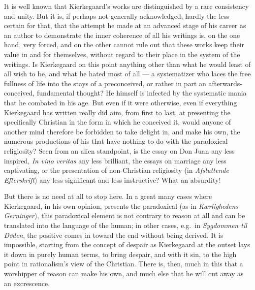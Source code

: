\documentclass[12pt,a4paper,openany]{book}
\newcommand{\opage}[1]{\marginnote{\footnotesize\textit{[#1]}}}
\begin{document}
It is well known that Kierkegaard's works are distinguished by a rare
consistency and unity. But it is, if perhaps not generally acknowledged,
hardly the less certain for that, that the attempt he made at an advanced
stage of his career as an author to demonstrate the inner coherence of
all his writings is, on the one hand, very forced, and on the other
cannot rule out that these works keep their value in and for themselves,
without regard to their place in the system of the writings. Is
Kierkegaard on this point anything other than what he would least of all
wish to be, and what he hated most of all --- a systematizer who laces the
free fullness of life into the stays of a preconceived, or rather in part
an afterwards-conceived, fundamental thought? He himself is infected by
the systematic mania that he combated in his age. But even if it were
otherwise, even if everything Kierkegaard has written really did aim,
from first to last, at presenting the specifically Christian in the form
in which he conceived it, would anyone of another mind therefore be
forbidden to take delight in, and make his own, the numerous productions
of his that have nothing to do with the paradoxical religiosity? Seen
from an alien standpoint, is the essay on Don Juan any less inspired,
\emph{In vino veritas} any less brilliant, the essays on marriage any less
captivating, or the presentation of non-Christian religiosity (in
\emph{Afsluttende Efterskrift}) any less significant and less instructive?
What an absurdity!

But there is no need at all to stop here. In a great many cases where
Kierkegaard, in his own opinion, presents the paradoxical (as in
\emph{Kærlighedens Gerninger}), this paradoxical element is not contrary to
reason at all and can be translated into the language of the human; in
other cases, e.g.\ in \emph{Sygdommen til Døden}, the positive comes in
toward the end without being derived. It is impossible, starting from the
concept of despair as Kierkegaard at the outset lays it down in purely
human terms, to bring despair, and with it sin, to the high point in
rationalism's view of the Christian. There is, then, much in this that a %
\opage{101}worshipper of reason can make his own, and much else that he will
cut away as an excrescence.
\end{document}
